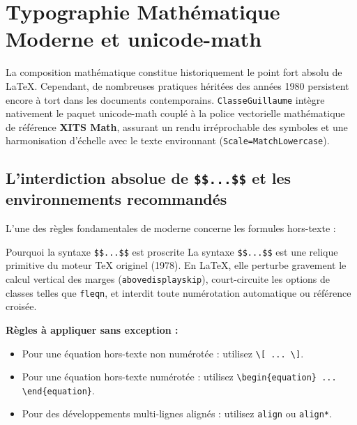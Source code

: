 \section{Typographie Mathématique Moderne et \textsf{unicode-math}}
\label{sec:formules_mathematiques}

La composition mathématique constitue historiquement le point fort absolu de \LaTeX{}.
Cependant, de nombreuses pratiques héritées des années 1980 persistent encore à tort dans les documents contemporains.
\texttt{ClasseGuillaume} intègre nativement le paquet \textsf{unicode-math} couplé à la police vectorielle mathématique de référence \textbf{XITS Math}, assurant un rendu irréprochable des symboles et une harmonisation d'échelle avec le texte environnant (\texttt{Scale=MatchLowercase}).

\subsection{L'interdiction absolue de \texttt{\$\$...\$\$} et les environnements recommandés}
\label{subsec:interdiction_dollars}

L'une des règles fondamentales de \LaTeXe{} moderne concerne les formules hors-texte :
\begin{boiteSynthese}{Pourquoi la syntaxe \texttt{\$\$...\$\$} est proscrite}
  La syntaxe \texttt{\$\$...\$\$} est une relique primitive du moteur \TeX{} originel (1978).
  En \LaTeX{}, elle perturbe gravement le calcul vertical des marges (\texttt{abovedisplayskip}), court-circuite les options de classes telles que \texttt{fleqn}, et interdit toute numérotation automatique ou référence croisée.
  
  \textbf{Règles à appliquer sans exception :}
  \begin{itemize}
    \item Pour une équation hors-texte non numérotée : utilisez \texttt{\textbackslash [ ... \textbackslash ]}.
    \item Pour une équation hors-texte numérotée : utilisez \texttt{\textbackslash begin\{equation\} ... \textbackslash end\{equation\}}.
    \item Pour des développements multi-lignes alignés : utilisez \texttt{align} ou \texttt{align*}.
  \end{itemize}
\end{boiteSynthese}

